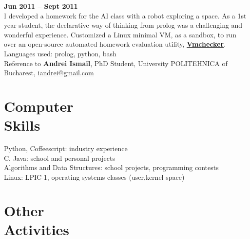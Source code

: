 \documentclass[margin,line]{resume}
\begin{document}
\begin{resume}
		\hfill \textbf{Jun 2011 -- Sept 2011}\vspace{1.2mm}\\
	I developed a homework for the AI class with a robot exploring a space. As a 1st year student, the declarative way of thinking from prolog was a challenging and wonderful experience. Customized a Linux minimal VM, as a sandbox, to run over an open-source automated homework evaluation utility, \href{https://elf.cs.pub.ro/vmchecker/ui/?locale=en}{\textbf{Vmchecker}}.\vspace{1.2mm}\\
	Languages used: prolog, python, bash\vspace{1.2mm}\\
	Reference to \textbf{Andrei Ismail}, PhD Student, University POLITEHNICA of Bucharest, \href{mailto:iandrei@gmail.com}{iandrei@gmail.com}

    \section{\mysidestyle Computer\\Skills}

	Python, Coffeescript: industry experience\\
	C, Java: school and personal projects\\
	Algorithms and Data Structures: school projects, programming contests\\
	Linux: LPIC-1, operating systems classes (user,kernel space)


    \section{\mysidestyle Other\\Activities}


\end{resume}
\end{document}
